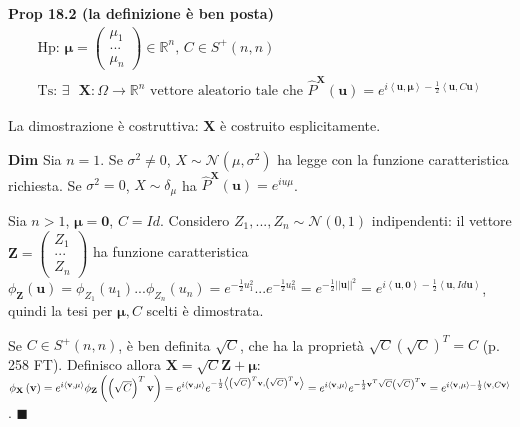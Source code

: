 \documentclass{article}
\begin{document}
\textbf{Prop 18.2 (la definizione \`{e} ben posta)}%
\begin{gather*}
\text{Hp: }\mathbf{\mu }=\left( 
\begin{array}{c}
\mu _{1} \\ 
... \\ 
\mu _{n}%
\end{array}%
\right) \in 
\mathbb{R}
^{n}\text{, }C\in S^{+}\left( n,n\right) \\
\text{Ts: }\exists \text{ }\mathbf{X}:\Omega \rightarrow 
\mathbb{R}
^{n}\text{ vettore aleatorio tale che }\hat{P}^{\mathbf{X}}\left( \mathbf{u}%
\right) =e^{i\left\langle \mathbf{u,\mu }\right\rangle -\frac{1}{2}%
\left\langle \mathbf{u},C\mathbf{u}\right\rangle }
\end{gather*}

La dimostrazione \`{e} costruttiva: $\mathbf{X}$ \`{e} costruito
esplicitamente.

\textbf{Dim} Sia $n=1$. Se $\sigma ^{2}\neq 0$, $X\sim \mathcal{N}\left( \mu
,\sigma ^{2}\right) $ ha legge con la funzione caratteristica richiesta. Se $%
\sigma ^{2}=0$, $X\sim \mathcal{\delta }_{\mu }$ ha $\hat{P}^{\mathbf{X}%
}\left( \mathbf{u}\right) =e^{iu\mu }$.

Sia $n>1$, $\mathbf{\mu =0}$, $C=Id$. Considero $Z_{1},...,Z_{n}\sim 
\mathcal{N}\left( 0,1\right) $ indipendenti: il vettore $\mathbf{Z}=\left( 
\begin{array}{c}
Z_{1} \\ 
... \\ 
Z_{n}%
\end{array}%
\right) $ ha funzione caratteristica $\phi _{\mathbf{Z}}\left( \mathbf{u}%
\right) =\phi _{Z_{1}}\left( u_{1}\right) ...\phi _{Z_{n}}\left(
u_{n}\right) =e^{-\frac{1}{2}u_{1}^{2}}...e^{-\frac{1}{2}u_{n}^{2}}=e^{-%
\frac{1}{2}\left\vert \left\vert \mathbf{u}\right\vert \right\vert
^{2}}=e^{i\left\langle \mathbf{u,0}\right\rangle -\frac{1}{2}\left\langle 
\mathbf{u},Id\mathbf{u}\right\rangle }$, quindi la tesi per $\mathbf{\mu },C$
scelti \`{e} dimostrata.

Se $C\in S^{+}\left( n,n\right) $, \`{e} ben definita $\sqrt{C}$, che ha la
propriet\`{a} $\sqrt{C}\left( \sqrt{C}\right) ^{T}=C$ (p. 258 FT). Definisco
allora $\mathbf{X}=\sqrt{C}\mathbf{Z+\mu }$: $\phi _{\mathbf{X}}\left( 
\mathbf{v}\right) =e^{i\left\langle \mathbf{v,\mu }\right\rangle }\phi _{%
\mathbf{Z}}\left( \left( \sqrt{C}\right) ^{T}\mathbf{v}\right)
=e^{i\left\langle \mathbf{v,\mu }\right\rangle }e^{-\frac{1}{2}\left\langle
\left( \sqrt{C}\right) ^{T}\mathbf{v},\left( \sqrt{C}\right) ^{T}\mathbf{v}%
\right\rangle }=e^{i\left\langle \mathbf{v,\mu }\right\rangle }e^{-\frac{1}{2%
}\mathbf{v}^{T}\sqrt{C}\left( \sqrt{C}\right) ^{T}\mathbf{v}%
}=e^{i\left\langle \mathbf{v,\mu }\right\rangle -\frac{1}{2}\left\langle 
\mathbf{v},C\mathbf{v}\right\rangle }$. $\blacksquare $
\end{document}
